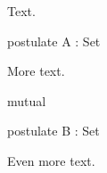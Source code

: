 \documentclass{article}
\begin{document}
\noindent Text.
\begin{code}
    postulate A : Set
\end{code}
More text.
\begin{AgdaMultiCode}{2}
\begin{code}
  mutual
\end{code}
\begin{code}
    postulate B : Set
\end{code}
\end{AgdaMultiCode}
Even more text.
\end{document}
